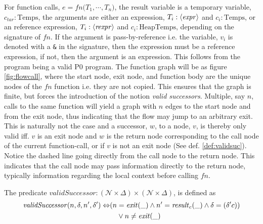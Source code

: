 For function calls, $e = fn\texttt{(}T_1,\cdots, T_n\texttt{)}$, the result variable is a temporary variable, $c_{tar}:\text{Temps}$, the arguments are either an expression, $T_i : \langle\mathit{expr}\rangle$ and $c_i : \text{Temps}$, or an reference expression, $T_i : \langle\mathit{rexpr}\rangle$ and $c_i : \text{HeapTemps}$, depending on the signature of $fn$. If the argument is pass-by-reference i.e. the variable, $v_i$ is denoted with a \texttt{\&} in the signature, then the expression must be a reference expression, if not, then the argument is an expression. This follows from the program being a valid P0 program. The function graph will be as figure \ref{fig:flowcall}, where the start node, exit node, and function body are the unique nodes of the $fn$ function i.e. they are not copied. This ensures that the graph is finite, but forces the introduction of the notion \emph{valid successors}. Multiple, say $n$, calls to the same function will yield a graph with $n$ edges to the start node and from the exit node, thus indicating that the flow may jump to an arbitrary exit. This is naturally not the case and a successor, $w$, to a node, $v$, is thereby only valid iff. $v$ is an exit node and $w$ is the return node corresponding to the call node of the current function-call, or if $v$ is not an exit node (See def. \ref{def:validsuc}). Notice the dashed line going directly from the call node to the return node. This indicates that the call node may pass information directly to the return node, typically information regarding the local context before calling $fn$.
\begin{definition}
\label{def:validsuc}
The predicate $\mathit{validSuccessor} : (\mathcal{N}\times \Delta) \times (\mathcal{N} \times \Delta)$, is defined as
\begin{align}
\mathit{validSuccessor}(n, \delta, n', \delta') \Leftrightarrow &(n = \mathit{exit}(\_) \wedge n' = \mathit{result}_c(\_) \wedge \delta  = (\delta' c)) \notag\\
&\quad\vee n \neq \mathit{exit}(\_)
\end{align}
\end{definition}

